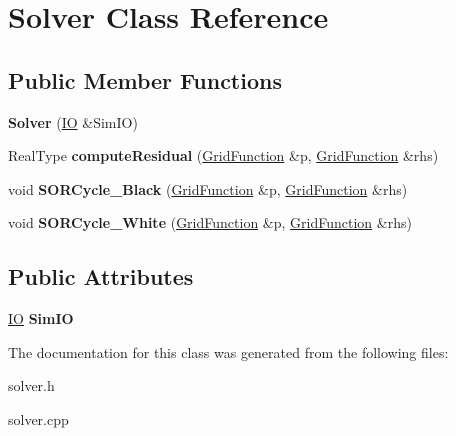 \hypertarget{classSolver}{\section{Solver Class Reference}
\label{classSolver}
}
\subsection*{Public Member Functions}
\begin{DoxyCompactItemize}
\item 
\hypertarget{classSolver_a8f448f36eb78f0d594785ba55b1931ae}{{\bfseries Solver} (\hyperlink{classIO}{I\-O} \&Sim\-I\-O)}\label{classSolver_a8f448f36eb78f0d594785ba55b1931ae}

\item 
\hypertarget{classSolver_a877656cf33692bf590a40c9e17ab236d}{Real\-Type {\bfseries compute\-Residual} (\hyperlink{classGridFunction}{Grid\-Function} \&p, \hyperlink{classGridFunction}{Grid\-Function} \&rhs)}\label{classSolver_a877656cf33692bf590a40c9e17ab236d}

\item 
\hypertarget{classSolver_aa9a2e5e7cbf97effe18095a2b76d25b9}{void {\bfseries S\-O\-R\-Cycle\-\_\-\-Black} (\hyperlink{classGridFunction}{Grid\-Function} \&p, \hyperlink{classGridFunction}{Grid\-Function} \&rhs)}\label{classSolver_aa9a2e5e7cbf97effe18095a2b76d25b9}

\item 
\hypertarget{classSolver_a88b8db61a0f830d5e54ae5b6ade94893}{void {\bfseries S\-O\-R\-Cycle\-\_\-\-White} (\hyperlink{classGridFunction}{Grid\-Function} \&p, \hyperlink{classGridFunction}{Grid\-Function} \&rhs)}\label{classSolver_a88b8db61a0f830d5e54ae5b6ade94893}

\end{DoxyCompactItemize}
\subsection*{Public Attributes}
\begin{DoxyCompactItemize}
\item 
\hypertarget{classSolver_a86fe364d5209d6de59ac3edd8916818e}{\hyperlink{classIO}{I\-O} {\bfseries Sim\-I\-O}}\label{classSolver_a86fe364d5209d6de59ac3edd8916818e}

\end{DoxyCompactItemize}


The documentation for this class was generated from the following files\-:\begin{DoxyCompactItemize}
\item 
solver.\-h\item 
solver.\-cpp\end{DoxyCompactItemize}
